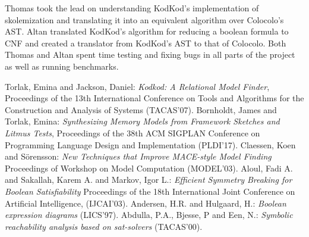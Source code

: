 \documentclass{article}
\theoremstyle{definition}
\begin{document}
    \textsf{Thomas} took the lead on understanding KodKod's implementation of skolemization and translating it into an equivalent algorithm over Colocolo's AST. \textsf{Altan} translated KodKod's algorithm for reducing a boolean formula to CNF and created a translator from KodKod's AST to that of Colocolo. Both \textsf{Thomas} and \textsf{Altan} spent time testing and fixing bugs in all parts of the project as well as running benchmarks.

    \begin{thebibliography}{999}
          Torlak, Emina and Jackson, Daniel:
          \emph{Kodkod: A Relational Model Finder},
          Proceedings of the 13th International Conference on Tools and Algorithms for the Construction and Analysis of Systems (TACAS'07).
          Bornholdt, James and Torlak, Emina:
          \emph{Synthesizing Memory Models from Framework Sketches and Litmus Tests},
          Proceedings of the 38th ACM SIGPLAN Conference on Programming Language Design and Implementation (PLDI'17).
          Claessen, Koen and S{\"o}rensson:
          \emph{New Techniques that Improve {MACE}-style Model Finding}
          Proceedings of Workshop on Model Computation (MODEL'03).
          Aloul, Fadi A. and Sakallah, Karem A. and Markov, Igor L.:
          \emph{Efficient Symmetry Breaking for Boolean Satisfiability}
          Proceedings of the 18th International Joint Conference on Artificial Intelligence, (IJCAI'03).
          Andersen, H.R. and Hulgaard, H.:
          \emph{Boolean expression diagrams}
          (LICS'97).
          Abdulla, P.A., Bjesse, P and Een, N.:
          \emph{Symbolic reachability analysis based on sat-solvers}
          (TACAS'00).
      \end{thebibliography}
  
\end{document}
